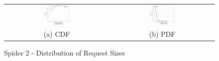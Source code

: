\begin{figure}[!t]
\begin{center}
\begin{tabular}{cc}
\hspace*{-1cm}                                                           
{\includegraphics[width=0.24\textwidth]{./figs/spider2-reqLatCDF.eps}}&
\hspace{-2mm}
{\includegraphics[width=0.24\textwidth]{./figs/spider2-reqLatPDF.eps}}\\
\small (a) CDF & \small(b) PDF \\
\end{tabular}
\vspace{-0.1in}
\caption{Spider 2 - Distribution of Request Sizes}
\label{fig:spider2-reqsizedist}
\end{center}
\end{figure}





 
